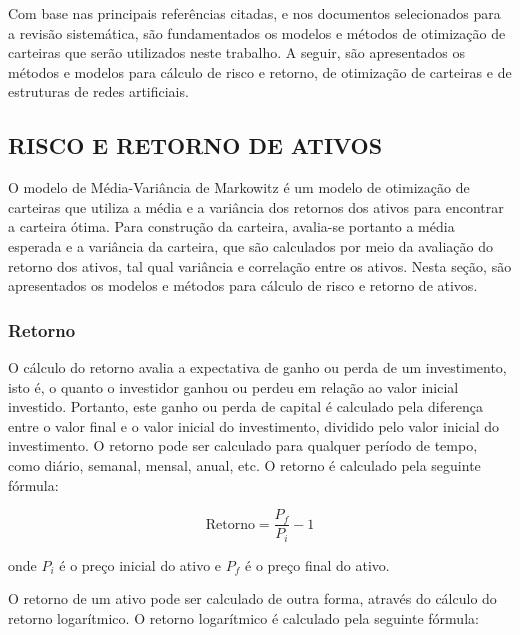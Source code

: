         \ipar Com base nas principais referências citadas, e nos documentos selecionados para a revisão sistemática, são fundamentados os modelos e métodos de otimização de carteiras que serão utilizados neste trabalho. A seguir, são apresentados os métodos e modelos para cálculo de risco e retorno, de otimização de carteiras e de estruturas de redes artificiais.
        
    \subsection{RISCO E RETORNO DE ATIVOS}
        \label{sec:retorno}

        \ipar O modelo de Média-Variância de Markowitz é um modelo de otimização de carteiras que utiliza a média e a variância dos retornos dos ativos para encontrar a carteira ótima. Para construção da carteira, avalia-se portanto a média esperada e a variância da carteira, que são calculados por meio da avaliação do retorno dos ativos, tal qual variância e correlação entre os ativos. Nesta seção, são apresentados os modelos e métodos para cálculo de risco e retorno de ativos.

        \subsubsection{Retorno}
            
            \ipar O cálculo do retorno avalia a expectativa de ganho ou perda de um investimento, isto é, o quanto o investidor ganhou ou perdeu em relação ao valor inicial investido. Portanto, este ganho ou perda de capital é calculado pela diferença entre o valor final e o valor inicial do investimento, dividido pelo valor inicial do investimento. O retorno pode ser calculado para qualquer período de tempo, como diário, semanal, mensal, anual, etc. O retorno é calculado pela seguinte fórmula:

            \begin{equation}
                \text{Retorno} = \frac{{P_f}}{{P_i}} - 1
            \end{equation}

            \noindent onde $P_i$ é o preço inicial do ativo e $P_f$ é o preço final do ativo. 

            \ipar O retorno de um ativo pode ser calculado de outra forma, através do cálculo do retorno logarítmico. O retorno logarítmico é calculado pela seguinte fórmula:


